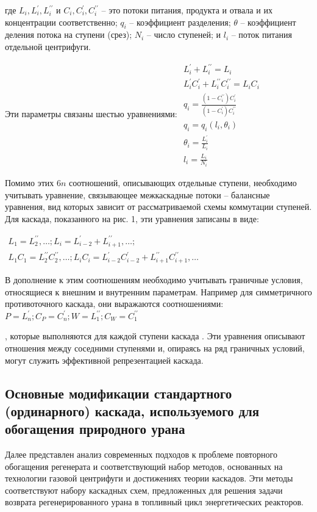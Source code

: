 где $L_{i}, L_{i}^{\prime}, L_{i}^{\prime \prime}$ и $C_{i}, C_{i}^{\prime}, C_{i}^{\prime \prime}$ -- 
это потоки питания, продукта и отвала и их концентрации соответственно; $q_{i}$ -- коэффициент разделения; $\theta$ -- коэффициент деления потока на ступени (срез); $N_{i}$ -- число ступеней; и $l_{i}$ -- поток питания отдельной центрифуги.

Эти параметры связаны шестью уравнениями:
$\begin{array}{c}
  {L_{i}^{\prime}+L_{i}^{\prime \prime}=L_{i}} \\
  {L_{i}^{\prime} C_{i}^{\prime}+L_{i}^{\prime \prime} C_{i}^{\prime \prime}=L_{i} C_{i}} \\
  {q_{i}=\frac{(1-C_{i}^{\prime \prime}) C_{i}^{\prime}}{(1-C_{i}^{\prime}) C_{i}^{\prime \prime}}} \\
  {q_{i}=q_{i}\left(l_{i}, \theta_{i}\right)} \\
  {\theta_{i}=\frac{L_{i}^{\prime}}{L_{i}}} \\
  {l_{i}=\frac{L_{i}}{N_{i}}}
\end{array}$


Помимо этих 6$n$ соотношений, описывающих отдельные ступени, необходимо учитывать уравнение, связывающее межкаскадные потоки -- балансные уравнения, вид которых зависит от рассматриваемой схемы коммутации ступеней. Для каскада, показанного на рис. 1, эти уравнения записаны в виде:

$\begin{array}{c}
  {L_{1}=L_{2}^{\prime \prime}, \ldots ; L_{i}=L_{i-2}^{\prime}+L_{i+1}^{\prime \prime}, \ldots ;} \\
  {L_{1} C_{1}=L_{2}^{\prime \prime} C_{2}^{\prime \prime}, \ldots ; L_{i} C_{i}=L_{i-2}^{\prime} C_{i-2}^{\prime}+L_{i+1}^{\prime \prime} C_{i+1}^{\prime \prime}, \ldots}
\end{array}$

В дополнение к этим соотношениям необходимо учитывать граничные условия, относящиеся к внешним и внутренним параметрам. Например для симметричного противоточного каскада, они выражаются соотношениями: 
$P=L_{n}^{\prime} ; C_{P}=C_{n}^{\prime} ; W=L_{1}^{\prime \prime} ; C_{W}=C_{1}^{\prime \prime}$

, которые выполняются для каждой ступени каскада \cite{palkinDeterminationOptimalParameters2012}. Эти уравнения описывают отношения между соседними ступенями и, опираясь на ряд граничных условий, могут служить эффективной репрезентацией каскада.

\subsection{Основные модификации стандартного (ординарного) каскада, используемого для обогащения природного урана}\label{sec:ch1/sec2.2}
Далее представлен анализ современных подходов к проблеме повторного обогащения регенерата и соответствующий набор методов, основанных на технологии газовой центрифуги и достижениях теории каскадов. Эти методы соответствуют набору каскадных схем, предложенных для решения задачи возврата регенерированного урана в топливный цикл энергетических реакторов.

